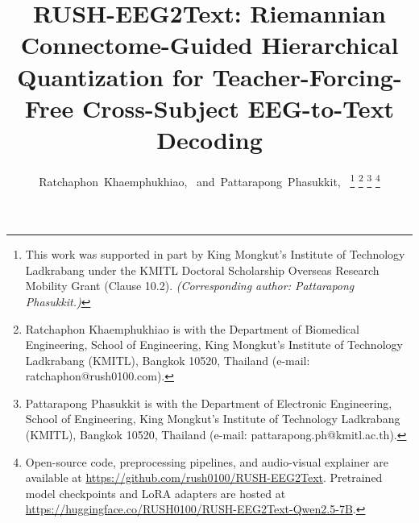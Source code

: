 \documentclass[journal]{IEEEtran}
\begin{document}
\title{RUSH-EEG2Text: Riemannian Connectome-Guided Hierarchical Quantization for Teacher-Forcing-Free Cross-Subject EEG-to-Text Decoding}

\author{
Ratchaphon~Khaemphukhiao,~
and~Pattarapong~Phasukkit,~%
\thanks{This work was supported in part by King Mongkut's Institute of Technology Ladkrabang under the KMITL Doctoral Scholarship Overseas Research Mobility Grant (Clause 10.2). \textit{(Corresponding author: Pattarapong Phasukkit.)}}%
\thanks{Ratchaphon Khaemphukhiao is with the Department of Biomedical Engineering, School of Engineering, King Mongkut's Institute of Technology Ladkrabang (KMITL), Bangkok 10520, Thailand (e-mail: ratchaphon@rush0100.com).}%
\thanks{Pattarapong Phasukkit is with the Department of Electronic Engineering, School of Engineering, King Mongkut's Institute of Technology Ladkrabang (KMITL), Bangkok 10520, Thailand (e-mail: pattarapong.ph@kmitl.ac.th).}%
\thanks{Open-source code, preprocessing pipelines, and audio-visual explainer are available at \url{https://github.com/rush0100/RUSH-EEG2Text}. Pretrained model checkpoints and LoRA adapters are hosted at \url{https://huggingface.co/RUSH0100/RUSH-EEG2Text-Qwen2.5-7B}.}%
}


\maketitle
\end{document}
